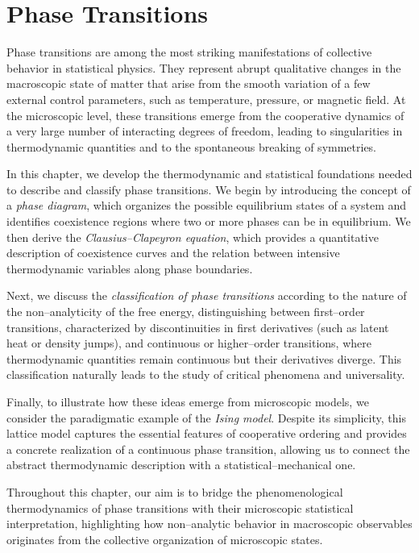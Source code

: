\chapter{Phase Transitions}

Phase transitions are among the most striking manifestations of collective behavior in statistical physics.
They represent abrupt qualitative changes in the macroscopic state of matter that arise from the smooth variation of a few external control parameters, such as temperature, pressure, or magnetic field.
At the microscopic level, these transitions emerge from the cooperative dynamics of a very large number of interacting degrees of freedom, leading to singularities in thermodynamic quantities and to the spontaneous breaking of symmetries.

In this chapter, we develop the thermodynamic and statistical foundations needed to describe and classify phase transitions.
We begin by introducing the concept of a \textit{phase diagram}, which organizes the possible equilibrium states of a system and identifies coexistence regions where two or more phases can be in equilibrium.
We then derive the \textit{Clausius--Clapeyron equation}, which provides a quantitative description of coexistence curves and the relation between intensive thermodynamic variables along phase boundaries.

Next, we discuss the \textit{classification of phase transitions} according to the nature of the non--analyticity of the free energy, distinguishing between first--order transitions, characterized by discontinuities in first derivatives (such as latent heat or density jumps), and continuous or higher--order transitions, where thermodynamic quantities remain continuous but their derivatives diverge.
This classification naturally leads to the study of critical phenomena and universality.

Finally, to illustrate how these ideas emerge from microscopic models, we consider the paradigmatic example of the \textit{Ising model}.
Despite its simplicity, this lattice model captures the essential features of cooperative ordering and provides a concrete realization of a continuous phase transition, allowing us to connect the abstract thermodynamic description with a statistical–mechanical one.

Throughout this chapter, our aim is to bridge the phenomenological thermodynamics of phase transitions with their microscopic statistical interpretation, highlighting how non--analytic behavior in macroscopic observables originates from the collective organization of microscopic states.

